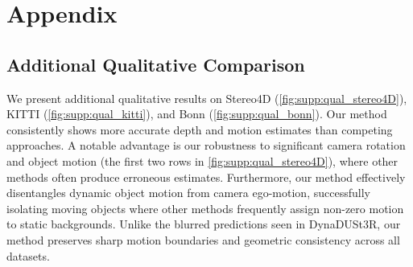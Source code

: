 \setcounter{figure}{0}
\renewcommand{\thefigure}{\Alph{figure}}
\setcounter{table}{0}
\renewcommand{\thetable}{\Alph{table}}



\section{Appendix}



\subsection{Additional Qualitative Comparison}
\label{supp:additional_qualitative}

We present additional qualitative results on Stereo4D (\cref{fig:supp:qual_stereo4D}), KITTI (\cref{fig:supp:qual_kitti}), and Bonn (\cref{fig:supp:qual_bonn}).
Our method consistently shows more accurate depth and motion estimates than competing approaches.
A notable advantage is our robustness to significant camera rotation and object motion (\eg the first two rows in \cref{fig:supp:qual_stereo4D}), where other methods often produce erroneous estimates.
Furthermore, our method effectively disentangles dynamic object motion from camera ego-motion, successfully isolating moving objects where other methods frequently assign non-zero motion to static backgrounds.
Unlike the blurred predictions seen in DynaDUSt3R, our method preserves sharp motion boundaries and geometric consistency across all datasets.




